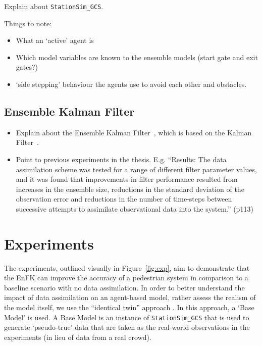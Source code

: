 \documentclass{article}
\begin{document}
Explain about \texttt{StationSim\_GCS}.

Things to note:
\begin{itemize}
  \item What an `active' agent is
  \item Which model variables are known to the ensemble models (start gate and exit gates?)  %
  \item `side stepping' behaviour the agents use to avoid each other and obstacles.
\end{itemize}

\subsection{Ensemble Kalman Filter}\label{sub:methods:enkf}

\begin{itemize}
    \item Explain about the Ensemble Kalman Filter~\citep{evensen2003ensemble},
        which is based on the Kalman Filter~\citep{kalman1960new}.
    \item Point to previous experiments in the thesis. E.g. ``Results: The data assimilation scheme was tested for a range of different filter
parameter values, and it was found that improvements in filter performance
resulted from increases in the ensemble size, reductions in the standard
deviation of the observation error and reductions in the number of time-steps
between successive attempts to assimilate observational data into the system.'' (p113)
\end{itemize}



\section{Experiments}\label{sec:exp}

The experiments, outlined visually in Figure~\ref{fig:exp}, aim to demonstrate that the EnFK can improve the accuracy of a pedestrian system in comparison to a baseline scenario with no data assimilation. In order to better understand the impact of data assimilation on an agent-based model, rather assess the realism of the model itself, we use the ``identical twin'' approach \citet{lueck_who_2019}. In this approach, a `Base Model' is used. A Base Model is an instance of    \texttt{StationSim\_GCS} that is used to generate `pseudo-true' data that are taken as the real-world observations in the experiments (in lieu of data from a real crowd).
\end{document}
